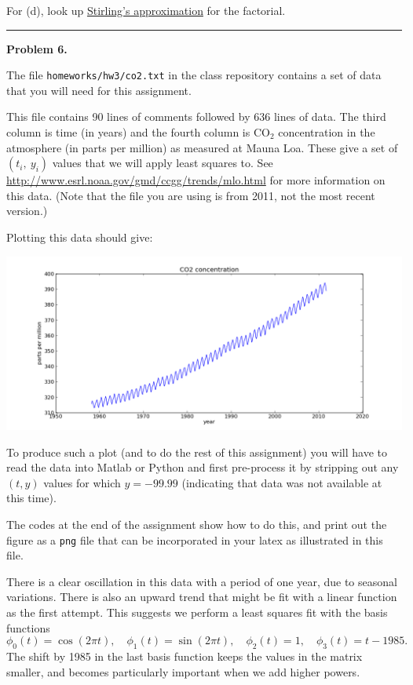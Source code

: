 \documentclass[10pt]{article}
\begin{document}
For (d), look up 
\href{https://en.wikipedia.org/wiki/Stirling%27s_approximation}{Stirling's
approximation} for the factorial.



\vskip 1cm
\hrule
{\bf Problem 6.}

The file {\tt homeworks/hw3/co2.txt} in the class repository
contains a set of data that you will need for this assignment.  

This file contains 90 lines of comments
followed by 636 lines of data.  The third column is time (in years) and the
fourth column is CO$_2$ concentration in the atmosphere (in parts per
million) as measured at Mauna Loa.  These give a set of $(t_i,~y_i)$ values
that we will apply least squares to.
See \url{http://www.esrl.noaa.gov/gmd/ccgg/trends/mlo.html}
for more information on this data.  
(Note that the file you are using is from 2011, not the most recent version.)

Plotting this data should give:

\centerline{\includegraphics[width=5.5in]{co2figure.png}}

\vskip 5pt
To produce such a plot (and to do the rest of this assignment) you will have
to read the data into Matlab or Python and first pre-process it by stripping
out any $(t,y)$ values for which $y = -99.99$ (indicating that data was not
available at this time).

The codes at the end of the assignment 
show how to do this, and print out the figure as
a {\tt png} file that can be incorporated in your latex as illustrated in
this file.


There is a clear oscillation in this data with a period of one
year, due to seasonal variations.  There is also an upward trend that might
be fit with a linear function as the first attempt.  This suggests we
perform a
least squares fit with the basis functions
\[
\phi_0(t) = \cos(2\pi t), \quad
\phi_1(t) = \sin(2\pi t), \quad
\phi_2(t) = 1, \quad
\phi_3(t) = t-1985. \quad
\]
The shift by 1985 in the last basis function keeps the values in the matrix
smaller, and becomes particularly important when we add higher powers.
\end{document}
